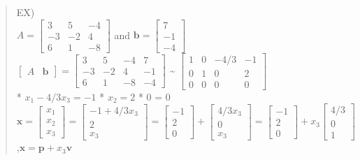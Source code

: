 \documentclass[11pt]{article}
\begin{document}
\begin{quote}
EX)\\
\(A = \begin{bmatrix} 3 & 5 & -4 \\ -3 & -2 & 4 \\ 6 & 1 & -8\end{bmatrix}\)
and \(\mathbf{b} = \begin{bmatrix} 7 \\ -1 \\ -4 \end{bmatrix}\)\\
\(\begin{bmatrix} A & \mathbf{b} \end{bmatrix} = \begin{bmatrix} 3 & 5 & -4 & 7 \\ -3 & -2 & 4 & -1 \\ 6 & 1 & -8 & -4\end{bmatrix}\)
\textbf{\textasciitilde{}}
\(\begin{bmatrix} 1 & 0 & -4/3 & -1 \\ 0 & 1 & 0 & 2 \\ 0 & 0 & 0 & 0\end{bmatrix}\)\\
* \(x_{1} - 4/3x_{3} = -1\) * \(x_{2} = 2\) * 0 = 0\\
\(\mathbf{x} = \begin{bmatrix} x_{1} \\ x_{2} \\ x_{3} \end{bmatrix} = \begin{bmatrix} -1 + 4/3x_{3} \\ 2 \\ x_{3} \end{bmatrix} = \begin{bmatrix} -1 \\ 2 \\ 0 \end{bmatrix} + \begin{bmatrix} 4/3x_{3} \\ 0 \\ x_{3} \end{bmatrix} = \begin{bmatrix} -1 \\ 2 \\ 0 \end{bmatrix} + x_{3}\begin{bmatrix} 4/3 \\ 0 \\ 1 \end{bmatrix}\)\\
,\(\mathbf{x} = \mathbf{p} + x_{3}\mathbf{v}\)
\end{quote}
\end{document}
